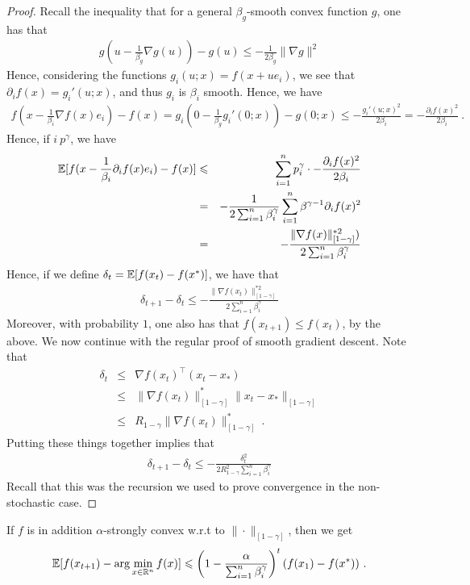 	\begin{proof}
	Recall the inequality that for a general $\beta_g$-smooth convex function $g$, one has that
	\begin{eqnarray}
    g\left(u - \frac{1}{\beta_g}\nabla g(u)\right) - g(u)
    \le -\frac{1}{2\beta_g} \|\nabla g\|^2
	\end{eqnarray}
	Hence, considering the functions $g_i(u;x) = f(x + ue_i)$, we see that $\partial_i f(x) = g_i'(u;x)$, and thus $g_i$ is $\beta_i$ smooth. Hence, we have 
	\begin{eqnarray}
    f\left(x - \frac{1}{\beta_i}\nabla f(x)e_i\right) - f(x)
    = g_i(0 - \frac{1}{\beta_g}g_i'(0;x)) - g(0;x)
    \le -\frac{g_i'(u;x)^2}{2\beta_i} = - \frac{\partial_i f(x)^2}{2\beta_i} \ .
	\end{eqnarray}
	Hence, if $i~p^\gamma$, we have
	\begin{eqnarray}
	  \operatorname*{\mathbb{E}}[f(x - \frac{1}{\beta_i}\partial_i f(x)e_i) - f(x)]
    &\leqslant& \sum_{i=1}^n p_i^\gamma \cdot - \frac{\partial_i f(x)^2}{2\beta_i}\\
	  &=& -\frac{1}{2\sum_{i=1}^n \beta_i^{\gamma}} \sum_{i=1}^n \beta^{\gamma - 1}\partial_i f(x)^2 \\
	  &=& -\frac{\|\nabla f(x)\|^{*2}_{[1-\gamma]})}{2\sum_{i=1}^n \beta_i^{\gamma}}
	\end{eqnarray}
	Hence, if we define $\delta_t = \operatorname*{\mathbb{E}}[f(x_t) - f(x^*)]$, we have that
	\begin{eqnarray}
	\delta_{t+1} - \delta_t \le -\frac{\|\nabla f(x_t)\|^{*2}_{[1-\gamma]}}{2\sum_{i=1}^n \beta_i^{\gamma}} 
	\end{eqnarray}
	Moreover, with probability $1$, one also has that $f(x_{t+1}) \le f(x_t)$, by the above. We now continue with the regular proof of smooth gradient descent. Note that
	\begin{eqnarray*}
	\delta_t &\le& \nabla f(x_t)^\top(x_t - x_*)\\
	&\le& \|\nabla f(x_t)\|_{[1-\gamma]}^*\|x_t - x_*\|_{[1-\gamma]}\\
	&\le& R_{1-\gamma}\|\nabla f(x_t)\|_{[1-\gamma]}^*\ .
	\end{eqnarray*}
	Putting these things together implies that
	\begin{eqnarray}
	\delta_{t+1} - \delta_t \le -\frac{\delta_t^2}{2R_{1-\gamma}^2\sum_{i=1}^n \beta_i^{\gamma}} 
	\end{eqnarray}
	Recall that this was the recursion we used to prove convergence in the non-stochastic case.
	\end{proof}
	\begin{theorem} If $f$ is in addition $\alpha$-strongly convex w.r.t to $\|\cdot\|_{[1-\gamma]}$, then we get 
	\begin{eqnarray}
    \operatorname*{\mathbb{E}}[f(x_{t+1}) - \arg\min_{x \in \mathbb{R}^{n}} f(x)]
    \leqslant \left(1 - \frac{\alpha}{\sum_{i=1}^n \beta_i^\gamma}\right)^t (f(x_1) - f(x^*)) \ .
	\end{eqnarray}
	\end{theorem}
